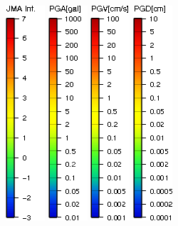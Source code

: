 \documentclass[10pt]{article}
\begin{document}
\begin{figure}[!ht]
    \centering
    \includegraphics[scale = 0.6]{jma-scale.png}
    \includegraphics[scale = 0.6]{pga-scale.png}
    \includegraphics[scale = 0.6]{pgv-scale.png}
    \includegraphics[scale = 0.6]{pgd-scale.png}

\end{figure}
\end{document}
